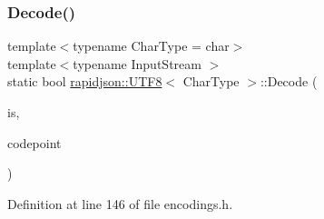\subsubsection{\texorpdfstring{Decode()}{Decode()}}
{\footnotesize\ttfamily template$<$typename Char\+Type  = char$>$ \\
template$<$typename Input\+Stream $>$ \\
static bool \mbox{\hyperlink{structrapidjson_1_1_u_t_f8}{rapidjson\+::\+U\+T\+F8}}$<$ Char\+Type $>$\+::Decode (\begin{DoxyParamCaption}\item[{Input\+Stream \&}]{is,  }\item[{unsigned $\ast$}]{codepoint }\end{DoxyParamCaption})\hspace{0.3cm}{\ttfamily [static]}}



Definition at line 146 of file encodings.\+h.


